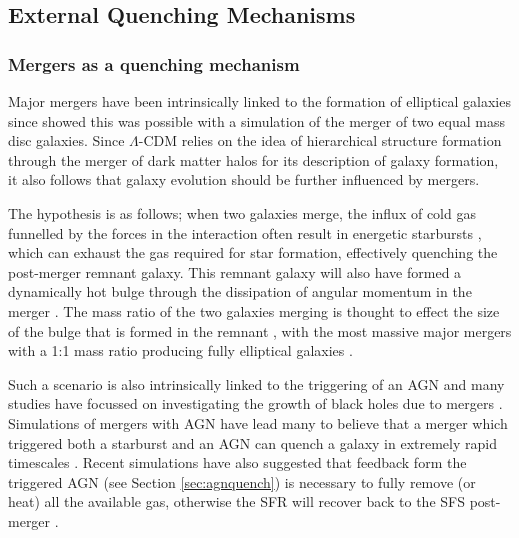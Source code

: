\subsection{External Quenching Mechanisms}\label{sec:extquench}
  
\subsubsection{Mergers as a quenching mechanism}\label{sec:mergersquench}

Major mergers have been intrinsically linked to the formation of elliptical galaxies since \citet{toomre72} showed this was possible with a simulation of the merger of two equal mass disc galaxies. Since $\Lambda$-CDM relies on the idea of hierarchical structure formation through the merger of dark matter halos for its description of galaxy formation, it also follows that galaxy evolution should be further influenced by mergers. 

The hypothesis is as follows; when two galaxies merge, the influx of cold gas funnelled by the forces in the interaction often result in energetic starbursts \citep{mihos94, mihos96, hopkins06d, hopkins08a, hopkins08b, snyder11, hayward14, sparre16}, which can exhaust the gas required for star formation, effectively quenching the post-merger remnant galaxy. This remnant galaxy will also have formed a dynamically hot bulge through the dissipation of angular momentum in the merger \citep{toomre77, walker96, kormendy04, hopkins11c, martig12}. The mass ratio of the two galaxies merging is thought to effect the size of the bulge that is formed in the remnant \citep{cox08, hopkins09c, tonini16}, with the most massive major mergers with a 1:1 mass ratio producing fully elliptical galaxies \citep{toomre72, barnes96, mihos96, kauffmann96, pontzen16}.

Such a scenario is also intrinsically linked to the triggering of an AGN \citep{sanders88, dimatteo05, hopkins09a, treister12} and many studies have focussed on investigating the growth of black holes due to mergers \citep[e.g.][]{veilleux02, bellovary13, ellison13, medling15, gabor16}. Simulations of mergers with AGN have lead many to believe that a merger which triggered both a starburst and an AGN can quench a galaxy in extremely rapid timescales \citep{springel05b, bell06}. Recent simulations have also suggested that feedback form the triggered AGN (see Section \ref{sec:agnquench}) is necessary to fully remove (or heat) all the available gas, otherwise the SFR will recover back to the SFS post-merger \citep{pontzen16, sparre16}. 


